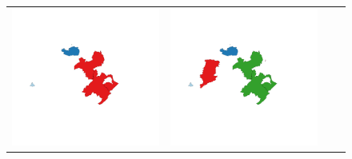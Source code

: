 \begin{figure}
\begin{tabularx}{1\textwidth}{XXXX}
\includegraphics[width=1\linewidth]{images/ch6/contig/03}&
\includegraphics[width=1\linewidth]{images/ch6/contig/04} \\

\end{tabularx}
\end{figure}
